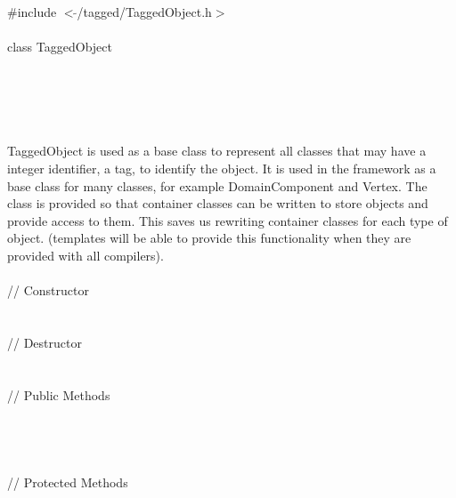 
   \\
\indent \#include $<\tilde{ }$/tagged/TaggedObject.h$>$ \\

  \\
\indent class TaggedObject  \\

 \\
 \\
\indent{} \\
\indent{} \\

  \\
\indent TaggedObject is used as a base class to represent all classes
that may have a integer identifier, a tag, to identify the object. It
is used in the framework as a base class for many classes, for example
DomainComponent and Vertex. The class is provided so that container
classes can be written to store objects and provide access to
them. This saves us rewriting container classes for each type of 
object. (templates will be able to provide this functionality when
they are provided with all compilers). \\ 

  \\
\indent // Constructor  \\
  \\ \\
\indent // Destructor  \\
  \\ \\
\indent // Public Methods  \\
 \\ 
 \\
 \\  \\ 
\indent // Protected Methods  \\
 \\

